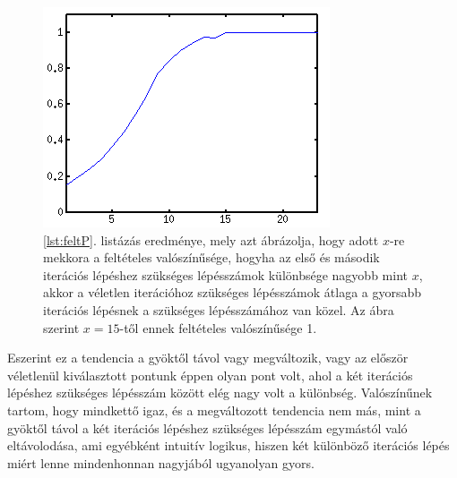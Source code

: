 \documentclass[a4paper,12pt]{report}
\begin{document}
                \begin{figure}[h]
					\centering
					\includegraphics[scale=0.7]{kepek/feltP.png}
					\caption{\ref{lst:feltP}. listázás eredménye, mely azt ábrázolja, hogy adott $x$-re mekkora a feltételes valószínűsége, hogyha az első és második iterációs lépéshez szükséges lépésszámok különbsége nagyobb mint $x$, akkor a véletlen iterációhoz szükséges lépésszámok átlaga a gyorsabb iterációs lépésnek a szükséges lépésszámához van közel. Az ábra szerint $x=15$-től ennek feltételes valószínűsége 1.}
				\end{figure}

				Eszerint ez a tendencia a gyöktől távol vagy megváltozik, vagy az először véletlenül kiválasztott pontunk éppen olyan pont volt, ahol a két iterációs lépéshez szükséges lépésszám között elég nagy volt a különbség. Valószínűnek tartom, hogy mindkettő igaz, és a megváltozott tendencia nem más, mint a gyöktől távol a két iterációs lépéshez szükséges lépésszám egymástól való eltávolodása, ami egyébként intuitív logikus, hiszen két különböző iterációs lépés miért lenne mindenhonnan nagyjából ugyanolyan gyors.











\end{document}
